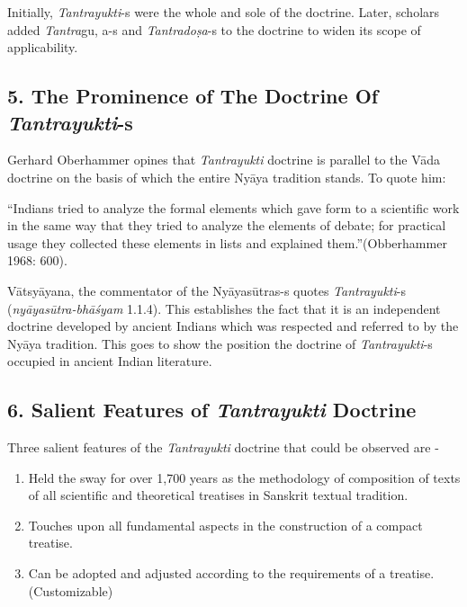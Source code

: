 Initially, \textit{Tantrayukti}-s were the whole and sole of the doctrine. Later, scholars added \textit{Tantra}gu, a-s and \textit{Tantradoṣa}-s to the doctrine to widen its scope of applicability.


\subsection*{5. The Prominence of The Doctrine Of \textit{Tantrayukti}-s}

Gerhard Oberhammer opines that \textit{Tantrayukti} doctrine is parallel to the Vāda doctrine on the basis of which the entire Nyāya tradition stands. To quote him:

“Indians tried to analyze the formal elements which gave form to a scientific work in the same way that they tried to analyze the elements of debate; for practical usage they collected these elements in lists and explained them.”\hfill (Obberhammer 1968: 600).

Vātsyāyana, the commentator of the Nyāyasūtras-s quotes \textit{Tantrayukti}-s (\textit{nyāyasūtra-bhāśyam} 1.1.4). This establishes the fact that it is an independent doctrine developed by ancient Indians which was respected and referred to by the Nyāya tradition. This goes to show the position the doctrine of \textit{Tantrayukti}-s occupied in ancient Indian literature.


\subsection*{6. Salient Features of \textit{Tantrayukti} Doctrine}

Three salient features of the \textit{Tantrayukti} doctrine that could be observed are -

\begin{enumerate}[{\rm 1.}]
\itemsep=0pt
\item Held the sway for over 1,700 years as the methodology of composition of texts of all scientific and theoretical treatises in Sanskrit textual tradition.

 \item Touches upon all fundamental aspects in the construction of a compact treatise.

 \item Can be adopted and adjusted according to the requirements of a treatise. (Customizable)

\end{enumerate}

